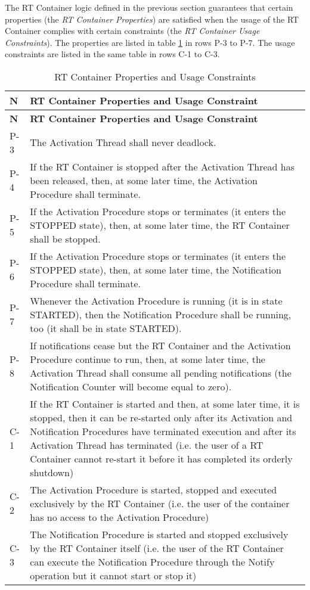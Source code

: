 The RT Container logic defined in the previous section guarantees that certain properties (the \textit{RT Container Properties}) are satisfied when the usage of the RT Container complies with certain constraints (the \textit{RT Container Usage Constraints}). The properties are listed in table \ref{tab:RTContProp} in rows P-3 to P-7. The usage constraints are listed in the same table in rows C-1 to C-3.

\begin{longtable}{|p{0.9cm}|p{10.3cm}|}
\caption{RT Container Properties and Usage Constraints} \label{tab:RTContProp}\\
\hline
\rowcolor{lightblue}
\textbf{N} & \textbf{RT Container Properties and Usage Constraint} \\
\hline\hline
\endfirsthead
\rowcolor{lightblue}
\textbf{N} & \textbf{RT Container Properties and Usage Constraint} \\
\hline\hline
\endhead
P-3 & The Activation Thread shall never deadlock. \\
\hline
P-4 & If the RT Container is stopped after the Activation Thread has been released, then, at some later time, the Activation Procedure shall terminate. \\
\hline
P-5 & If the Activation Procedure stops or terminates (it enters the STOPPED state), then,
at some later time, the RT Container shall be stopped. \\
\hline
P-6 & If the Activation Procedure stops or terminates (it enters the STOPPED state), then,
at some later time, the Notification Procedure shall terminate. \\
\hline
P-7 & Whenever the Activation Procedure is running (it is in state STARTED), then the
Notification Procedure shall be running, too (it shall be in state STARTED). \\
\hline
P-8 & If notifications cease but the RT Container and the Activation Procedure continue to run, then, at some later time, the Activation Thread shall consume all pending notifications (the Notification Counter will become equal to zero). \\
\hline
C-1 & If the RT Container is started and then, at some later time, it is stopped, then it can be re-started only after its Activation and Notification Procedures have terminated
execution and after its Activation Thread has terminated (i.e. the user of a RT Container cannot re-start it before it has completed its orderly shutdown) \\
\hline
C-2 & The Activation Procedure is started, stopped and executed exclusively by the RT
Container (i.e. the user of the container has no access to the Activation Procedure) \\
\hline
C-3 & The Notification Procedure is started and stopped exclusively by the RT Container
itself (i.e. the user of the RT Container can execute the Notification Procedure through the Notify operation but it cannot start or stop it) \\
\hline
\end{longtable}

